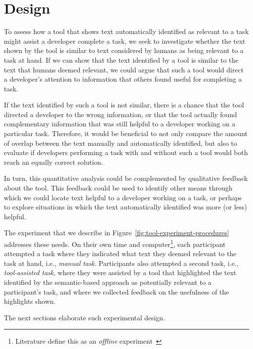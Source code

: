 
\section{Design}
\label{cp6:design}



To assess how a tool that shows text automatically identified as relevant to a task
might assist a developer complete a task, 
we seek to investigate whether the text shown by the tool 
is similar to text considered
by humans as being relevant to a task at hand.
If we can show that 
the text identified by a tool is similar to the text that humans deemed relevant, we could argue that such a tool  
would direct a developer's attention to information that others found useful for completing a task.


If the text identified by such a tool is not similar, there is a chance that the tool directed a developer to the wrong information, or that 
the tool actually found complementary information that was still helpful to a developer working on a particular task. 
Therefore, it would be beneficial to not only compare the amount of overlap between the text manually
and automatically identified, but also to evaluate if developers performing a task with and without such a tool would 
both reach an equally correct solution.


In turn, this quantitative analysis could be complemented by qualitative feedback about the tool. 
This feedback could be used to identify other means through which we could locate 
text helpful to a developer working on a task, or perhaps to explore
situations in which the text automatically identified 
was more (or less) helpful.



The experiment that we describe in Figure~\ref{fig:tool-experiment-procedures} addresses these needs. 
On their own time and computer\footnote{Literature define this as an \textit{offline} experiment~\cite{wohlin2012, DeLucia2012} }, 
each participant attempted a task where they indicated 
what text they deemed relevant to the task at hand, i.e., \textit{manual task}.
Participants also attempted a second task, i.e., \textit{tool-assisted task},
 where they were assisted by a tool that highlighted the text identified by 
the semantic-based approach as potentially relevant to a participant's task,
and where we collected feedback on the usefulness of the highlights shown. 


The next sections elaborate such experimental design. 


